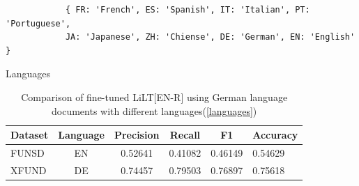 \begin{listing}[!ht]

\begin{verbatim}
            { FR: 'French', ES: 'Spanish', IT: 'Italian', PT: 'Portuguese', 
            JA: 'Japanese', ZH: 'Chiense', DE: 'German', EN: 'English' }
\end{verbatim}
\caption{Languages}
\label{languages}
\end{listing}


\begin{table}[!ht]
    \centering
    \captionsetup{justification=centering}
    \begin{tabular}{lccccl}
        \toprule
         \textbf{Dataset}& \textbf{Language}& \textbf{Precision}& \textbf{Recall}& \textbf{F1} & \textbf{Accuracy}  \\ \midrule
         FUNSD & EN & 0.52641 & 0.41082 & 0.46149 & 0.54629\\
         XFUND & DE &  0.74457 & 0.79503 & 0.76897 & 0.75618 \\ \bottomrule
    \end{tabular}
    \caption{Comparison of fine-tuned LiLT[EN-R] using German language documents with different languages(\cref{languages})}
    \label{tab:EN_R_on_different_languages}
\end{table}



